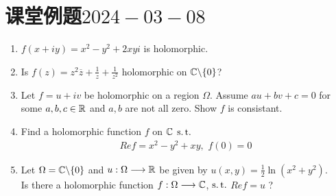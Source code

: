 \section{课堂例题$2024-03-08$}
\begin{enumerate}
	\item $f(x + i y) = x^2 - y^2 + 2xy i$ is holomorphic.
	
	\vspace{2em}
	
	\item Is $f(z) = z^2 \overline{z} + \frac{1}{z} + \frac{1}{z^2}$ holomorphic on $\mathbb{C} \backslash \{ 0 \}$?
	
	\vspace{2em}
	
	\item Let $f = u + i v$ be holomorphic on a region $\Omega$. Assume $au + bv + c = 0$ for some $a , b , c \in \mathbb{R}$ and $a , b$ are not all zero. Show $f$ is consistant.
	
	\vspace{2em}
	
	\item Find a holomorphic function $f$ on $\mathbb{C}$ $\operatorname{s.t.}$
	\begin{align}
		Re f = x^2 - y^2 + xy , \,\, f(0) = 0
	\end{align}
	
	\vspace{2em}
	
	\item Let $\Omega = \mathbb{C} \backslash \{ 0 \}$ and $u : \Omega \longrightarrow \mathbb{R}$ be given by $u(x , y) = \frac{1}{2} \ln(x^2 + y^2)$.\\
	Is there a holomorphic function $f : \Omega \longrightarrow \mathbb{C}$, $\operatorname{s.t.}$ $Ref = u$ ?
	

\end{enumerate}
